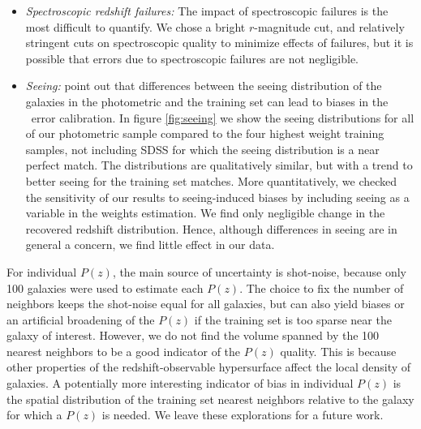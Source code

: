 \documentclass[preprint]{aastex}
\begin{document}
\begin{itemize}
\item {\it Spectroscopic redshift failures: } The impact of spectroscopic failures is the
most difficult to quantify.  We chose a bright $r$-magnitude cut, and relatively
stringent cuts on spectroscopic quality to minimize effects of failures, but it
is possible that errors due to spectroscopic failures are not negligible.

\item {\it Seeing: } \citet{Nakajima11} point out that differences
between the seeing distribution of the galaxies in the photometric and the
training set can lead to biases in the \photoz\ error calibration.  In figure
\ref{fig:seeing} we show the seeing distributions for all of our photometric
sample compared to the four highest weight training samples, not including SDSS
for which the seeing distribution is a near perfect match.  The distributions
are qualitatively similar, but with a trend to better seeing for the training
set matches.  More quantitatively, we checked the sensitivity of our results to
seeing-induced biases by including seeing as a variable in the weights
estimation.  We find only negligible change in the recovered redshift
distribution.  Hence, although differences in seeing are in general a concern, we
find little effect in our data.
\end{itemize}

For individual $P(z)$, the main source of uncertainty is shot-noise, because
only 100 galaxies were used to estimate each $P(z)$.  The choice to fix the
number of neighbors keeps the shot-noise equal for all galaxies, but can also
yield biases or an artificial broadening of the $P(z)$ if the training set is
too sparse near the galaxy of interest.  However, we do not find the volume
spanned by the 100 nearest neighbors to be a good indicator of the $P(z)$
quality. This is because other properties of the redshift-observable
hypersurface affect the local density of galaxies.  A potentially more
interesting indicator of bias in individual $P(z)$ is the spatial distribution
of the training set nearest neighbors relative to the galaxy for which a $P(z)$
is needed.  We leave these explorations for a future work.
\end{document}
